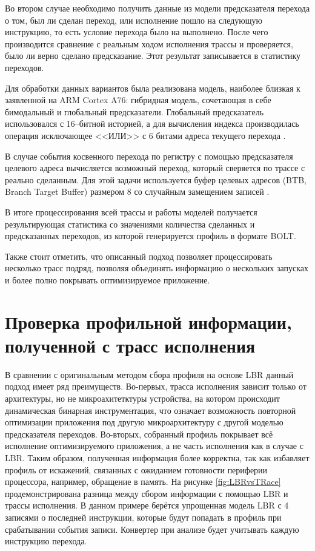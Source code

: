 Во втором случае необходимо получить данные из модели предсказателя перехода о том, был ли сделан переход, или исполнение пошло на следующую инструкцию, то есть условие перехода было на выполнено. После чего производится сравнение с реальным ходом исполнения трассы и проверяется, было ли верно сделано предсказание. Этот результат записывается в статистику переходов.

Для обработки данных вариантов была реализована модель, наиболее близкая к заявленной на ARM Cortex A76: гибридная модель, сочетающая в себе бимодальный и глобальный предсказатели. Глобальный предсказатель использовался с 16--битной историей, а для вычисления индекса производилась операция исключающее <<ИЛИ>> с 6 битами адреса текущего перехода \cite{Smith1981}.

В случае события косвенного перехода по регистру с помощью предсказателя целевого адреса вычисляется возможный переход, который сверяется по трассе с реально сделанным. Для этой задачи используется буфер целевых адресов (BTB, Branch Target Buffer) размером 8 со случайным замещением записей \cite{Ajorpaz2018}.

В итоге процессирования всей трассы и работы моделей получается результирующая статистика со значениями количества сделанных и предсказанных переходов, из которой генерируется профиль в формате BOLT.

Также стоит отметить, что описанный подход позволяет процессировать несколько трасс подряд, позволяя объединять информацию о нескольких запусках и более полно покрывать оптимизируемое приложение.

\section{Проверка профильной информации, полученной с трасс исполнения}\label{sec:ch2/sec4}
В сравнении с оригинальным методом сбора профиля на основе LBR данный подход имеет ряд преимуществ. Во-первых, трасса исполнения зависит только от архитектуры, но не микроахитетктуры устройства, на котором происходит динамическая бинарная инструментация, что означает возможность повторной оптимизации приложения под другую микроархитектуру с другой моделью предсказателя переходов. Во-вторых, собранный профиль покрывает всё исполнение оптимизируемого приложения, а не часть исполнения как в случае с LBR. Таким образом, полученная информация более корректна, так как избавляет профиль от искажений, связанных с ожиданием готовности периферии процессора, например, обращение в память.
На рисунке \cref{fig:LBRvsTRace} продемонстрирована разница между сбором информации с помощью LBR и трассы исполнения. В данном примере берётся упрощенная модель LBR с 4 записями о последней инструкции, которые будут попадать в профиль при срабатывании события записи. Конвертер при анализе будет учитывать каждую инструкцию перехода.

